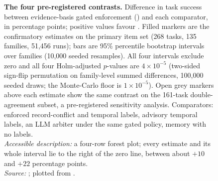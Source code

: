 \begin{figure}[t]
\vspace{-1mm}
\caption[Pre-registered confirmatory contrasts]{%
\textbf{The four pre-registered contrasts.} Difference in task success between evidence-basis gated enforcement
() and each comparator, in percentage points; positive values favour . Filled markers are the
confirmatory estimates on the primary item set (268 tasks, 135 families, 51{,}456 runs); bars are 95\% percentile
bootstrap intervals over families (10{,}000 seeded resamples). All four intervals exclude zero and all four
Holm-adjusted $p$-values are $4\times10^{-5}$ (two-sided sign-flip permutation on family-level summed differences,
100{,}000 seeded draws; the Monte-Carlo floor is $1\times10^{-5}$). Open grey markers above each estimate show the
same contrast on the 161-task double-agreement subset, a pre-registered sensitivity analysis. Comparators:
 enforced record-conflict and temporal labels,  advisory temporal labels,  an LLM arbiter
under the same gated policy,  memory with no labels.\\
\emph{Accessible description:} a four-row forest plot; every estimate and its whole interval lie to the right of
the zero line, between about $+10$ and $+22$ percentage points.\\
\emph{Source:} ; plotted from
.}
\label{fig:forest}
\end{figure}

